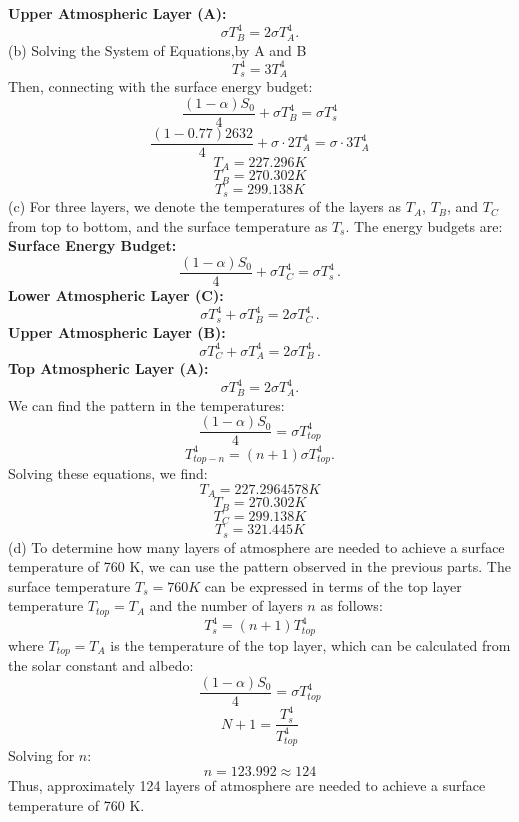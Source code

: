 \documentclass[letterpaper, 11pt]{article}
\newcommand{\1}{\mathds{1}}	%
\theoremstyle{definition}
\begin{document}
\textbf{Upper Atmospheric Layer (A):} 
\begin{equation*}
\sigma T_B^4 = 2\sigma T_A^4.
\end{equation*}
(b) Solving the System of Equations,by A and B
\[T_s^4=3T_A^4\]
Then, connecting with the surface energy budget:
\[\frac{(1-\alpha)S_0}{4} + \sigma T_B^4 = \sigma T_s^4\]
\[\frac{(1-0.77)2632}{4} + \sigma \cdot2T_A^4 = \sigma \cdot 3T_A^4\]
\[T_A = 227.296 K\]
\[T_B = 270.302K\]
\[T_s = 299.138K\]
(c) For three layers, we denote the temperatures of the layers as $T_A$, $T_B$, and $T_C$ from top to bottom, and the surface temperature as $T_s$. The energy budgets are:
\textbf{Surface Energy Budget:}
\begin{equation*}
\frac{(1-\alpha)S_0}{4} + \sigma T_C^4 = \sigma T_s^4\,.
\end{equation*}
\textbf{Lower Atmospheric Layer (C):}
\begin{equation*}
\sigma T_s^4 + \sigma T_B^4 = 2\sigma T_C^4\,.
\end{equation*}
\textbf{Upper Atmospheric Layer (B):}
\begin{equation*}
\sigma T_C^4 + \sigma T_A^4 = 2\sigma T_B^4\,.
\end{equation*}
\textbf{Top Atmospheric Layer (A):}
\begin{equation*}
\sigma T_B^4 = 2\sigma T_A^4.
\end{equation*}
We can find the pattern in the temperatures:
\[\frac{(1-\alpha)S_0}{4} = \sigma T_{top}^4\]
\[T_{top-n}^4 = (n+1)\sigma T_{top}^4.\]
Solving these equations, we find:
\[T_A = 227.2964578 K\]
\[T_B = 270.302K\]
\[T_C = 299.138K\]
\[T_s = 321.445K\]
(d) To determine how many layers of atmosphere are needed to achieve a surface temperature of 760 K, we can use the pattern observed in the previous parts. The surface temperature $T_s=760K$ can be expressed in terms of the top layer temperature $T_{top}=T_A$ and the number of layers $n$ as follows:
\[T_s^4 = (n+1)T_{top}^4\]
where $T_{top}=T_A$ is the temperature of the top layer, which can be calculated from the solar constant and albedo:
\[\frac{(1-\alpha)S_0}{4} = \sigma T_{top}^4\]
\[N+1 = \frac{T_s^4}{T_{top}^4}\]
Solving for $n$:
\[n=123.992\approx124\]
Thus, approximately 124 layers of atmosphere are needed to achieve a surface temperature of 760 K.
\end{document}

